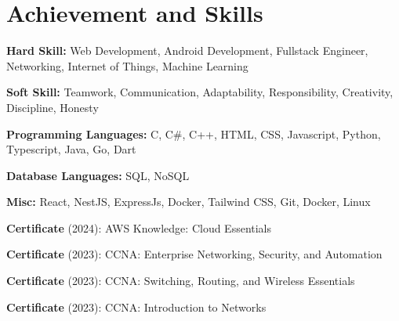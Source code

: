 \documentclass[../main.tex]{subfiles}
\begin{document}
\section{Achievement and Skills}

\begin{highlights}
	\item \textbf{Hard Skill:} Web Development, Android Development, Fullstack Engineer, Networking, Internet of Things, Machine Learning
	\item \textbf{Soft Skill:} Teamwork, Communication, Adaptability, Responsibility, Creativity, Discipline, Honesty
	\item \textbf{Programming Languages:} C, C\#, C++, HTML, CSS, Javascript, Python, Typescript, Java, Go, Dart
	\item \textbf{Database Languages:} SQL, NoSQL
	\item \textbf{Misc:} React, NestJS, ExpressJs, Docker, Tailwind CSS, Git, Docker, Linux
	\item \textbf{Certificate} (2024): AWS Knowledge: Cloud Essentials
	\item \textbf{Certificate} (2023): CCNA: Enterprise Networking, Security, and Automation
	\item \textbf{Certificate} (2023): CCNA: Switching, Routing, and Wireless Essentials
	\item \textbf{Certificate} (2023): CCNA: Introduction to Networks
\end{highlights}
\end{document}
